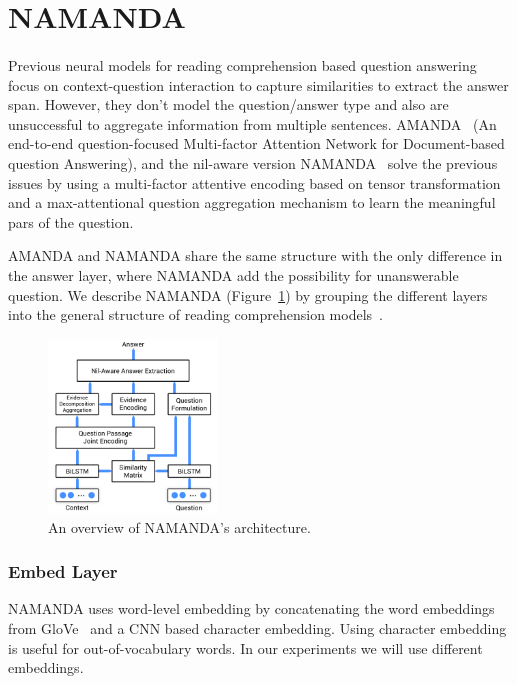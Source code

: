 \section{NAMANDA}
\label{sec:namanda}
\paragraph{}
Previous neural models for reading comprehension based question answering \citep{seo2016bidirectional, yang2017words} focus on context-question interaction to capture similarities to extract the answer span. However, they don't model the question/answer type and also are unsuccessful to aggregate information from multiple sentences. AMANDA~\citep{kundu2018amanda} (An end-to-end question-focused Multi-factor Attention Network for Document-based question Answering), and the nil-aware version NAMANDA~\citep{kundu2018namanda} solve the previous issues by using a multi-factor attentive encoding based on tensor transformation and a max-attentional question aggregation mechanism to learn the meaningful pars of the question. 

AMANDA and NAMANDA share the same structure with the only difference in the answer layer, where NAMANDA add the possibility for unanswerable question. We describe NAMANDA (Figure~\ref{fig:namanda}) by grouping the different layers into the general structure of reading comprehension models~\citep{qiu2019survey}.  

\begin{figure}[h]
\centering
\includegraphics[width=0.4\textwidth]{images/namanda.pdf}
\caption{An overview of NAMANDA's architecture.}
\label{fig:namanda}
\end{figure}


\subsubsection{Embed Layer}
NAMANDA uses word-level embedding by concatenating the word embeddings from GloVe~\citep{pennington2014glove} and a CNN based character embedding. Using character embedding is useful for out-of-vocabulary words. In our experiments we will use different embeddings.


